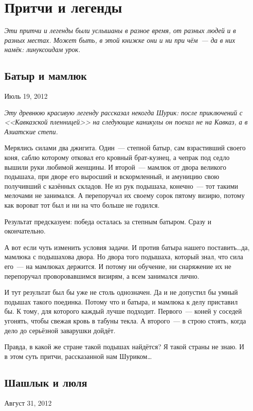 \chapter{Притчи и легенды}

\textsl{Эти притчи и легенды были услышаны в разное время, от разных людей и в разных местах. Может быть, в этой книжке они и ни при чём~--- да в них намёк: линуксоидам урок.}

\section{Батыр и мамлюк} 
\begin{timeline}Июль 19, 2012\end{timeline}

\textsl{Эту древнюю красивую легенду рассказал некогда Шурик: после приключений с <<Кавказской пленницей>> на следующие каникулы он поехал не на Кавказ, а в Азиатские степи.}\medskip

Мерялись силами два джигита. Один~--- степной батыр, сам взрастивший своего коня, саблю которому отковал его кровный брат-кузнец, а чепрак под седло вышили руки любимой женщины. И второй~--- мамлюк от двора великого подышаха, при дворе его выросший и вскормленный, и амуницию свою получивший с казённых складов. Не из рук подышаха, конечно~--- тот такими мелочами не занимался. А перепоручал их своему сорок пятому визирю, потому как вороват тот был и ни на что больше не годился.

Результат предсказуем: победа осталась за степным батыром. Сразу и окончательно.

А вот если чуть изменить условия задачи. И против батыра нашего поставить\dots да, мамлюка с подышахова двора. Но двора того подышаха, который знал, что сила его~--- на мамлюках держится. И потому ни обучение, ни снаряжение их не перепоручал проворовавшимся визирям, а всем занимался лично.

И тут результат был бы уже не столь однозначен. Да и не допустил бы умный подышах такого поединка. Потому что и батыра, и мамлюка к делу приставил бы. К тому, для которого каждый лучше подходит. Первого~--- коней у соседей угонять, чтобы свежая кровь в табуны текла. А второго~--- в строю стоять, когда дело до серьёзной заварушки дойдёт.

Правда, в какой же стране такой подышах найдётся? Я такой страны не знаю. И в этом суть притчи, рассказанной нам Шуриком\dots

\section{Шашлык и люля} 
\begin{timeline}Август 31, 2012\end{timeline}

